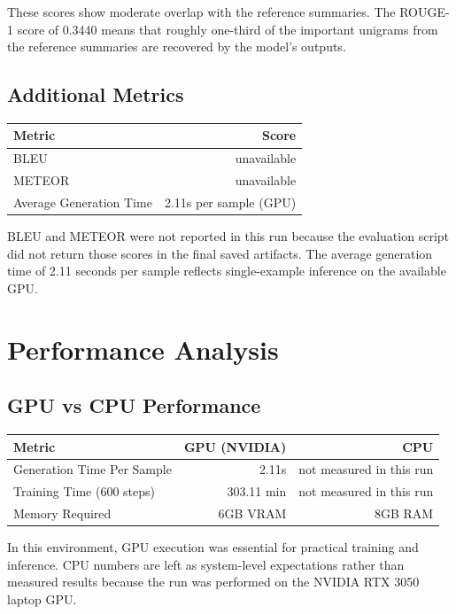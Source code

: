 \documentclass[12pt,a4paper,oneside]{report}
\begin{document}
These scores show moderate overlap with the reference summaries. The ROUGE-1 score of 0.3440 means that roughly one-third of the important unigrams from the reference summaries are recovered by the model's outputs.

\subsection{Additional Metrics}
\begin{table}[H]
\centering
\begin{tabular}{lr}
\toprule
\textbf{Metric} & \textbf{Score} \\
\midrule
BLEU & unavailable \\
METEOR & unavailable \\
Average Generation Time & 2.11s per sample (GPU) \\
\bottomrule
\end{tabular}
\end{table}

BLEU and METEOR were not reported in this run because the evaluation script did not return those scores in the final saved artifacts. The average generation time of 2.11 seconds per sample reflects single-example inference on the available GPU.

\section{Performance Analysis}

\subsection{GPU vs CPU Performance}
\begin{table}[H]
\centering
\begin{tabular}{lrr}
\toprule
\textbf{Metric} & \textbf{GPU (NVIDIA)} & \textbf{CPU} \\
\midrule
Generation Time Per Sample & 2.11s & not measured in this run \\
Training Time (600 steps) & 303.11 min & not measured in this run \\
Memory Required & 6GB VRAM & 8GB RAM \\
\bottomrule
\end{tabular}
\end{table}

In this environment, GPU execution was essential for practical training and inference. CPU numbers are left as system-level expectations rather than measured results because the run was performed on the NVIDIA RTX 3050 laptop GPU.
\end{document}
